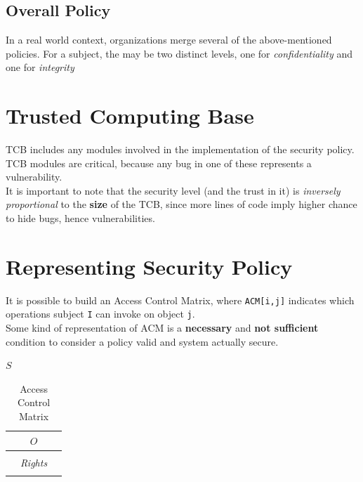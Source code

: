 \subsection{Overall Policy}
In a real world context, organizations merge several of the above-mentioned policies.
For a subject, the may be two distinct levels, one for \textit{confidentiality} and one for \textit{integrity}

\section{Trusted Computing Base}
TCB includes any modules involved in the implementation of the security policy.
TCB modules are critical, because any bug in one of these represents a vulnerability.\\
It is important to note that the security level (and the trust in it) is \textit{inversely proportional} to the \textbf{size} of the TCB,
since more lines of code imply higher chance to hide bugs,
hence vulnerabilities.

\section{Representing Security Policy}
It is possible to build an Access Control Matrix, where \lstinline|ACM[i,j]| indicates which operations subject \lstinline{I} can invoke on object \lstinline{j}.\\
Some kind of representation of ACM is a \textbf{necessary} and \textbf{not sufficient} condition to consider a policy valid and system actually secure. 
\begin{table}[h]
    \centering
    $S$
    \begin{tabular}{|c|c|c|}
        \multicolumn{3}{c}{$O$}\\
        \hline
         & &\\
         \hline
         & \textit{Rights} &\\
         \hline
         & & \\
         \hline
    \end{tabular}
    \caption{Access Control Matrix}
    \label{tab:ACM}
\end{table}